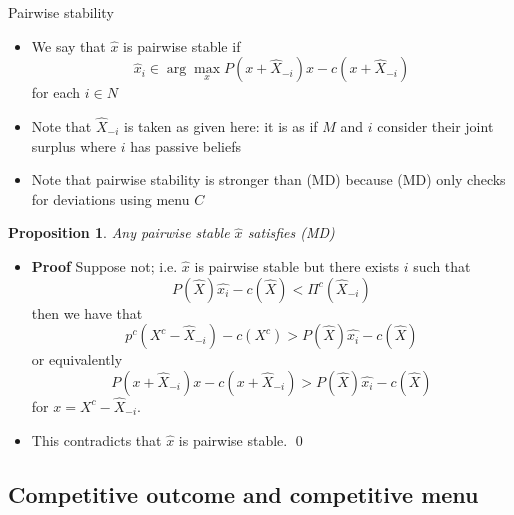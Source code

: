 \documentclass[11pt,english]{beamer}
\newtheorem{proposition}{Proposition}
\begin{document}
\begin{frame}[allowframebreaks]{Pairwise stability}
  \begin{itemize}
  \item We say that $\hat{x}$ is pairwise stable if
    \begin{equation}
      \label{eq:PairwiseStable}
      \hat{x}_i \in \arg\max_{x} P(x+\hat{X}_{-i})x-c(x+\hat{X}_{-i})
    \end{equation}
    for each $i \in N$
  \item Note that $\hat{X}_{-i}$ is taken as given here: it is as if
    $M$ and $i$ consider their joint surplus where $i$ has passive
    beliefs
  \item Note that pairwise stability is stronger than (MD) because
    (MD) only checks for deviations using menu $C$
  \end{itemize}
  \begin{proposition}
    Any pairwise stable $\hat{x}$ satisfies (MD)
  \end{proposition}
  \begin{itemize}
  \item \textbf{Proof} Suppose not; i.e. $\hat{x}$ is pairwise stable
    but there exists $i$ such that
    \begin{equation*}
      P(\hat{X})\hat{x_i} - c(\hat{X}) < \Pi^c(\hat{X}_{-i})
    \end{equation*}
    then we have that
    \begin{equation*}
      p^c(X^c - \hat{X}_{-i}) - c(X^c) >  P(\hat{X})\hat{x_i} - c(\hat{X})
    \end{equation*}
    or equivalently
    \begin{equation*}
      P(x+ \hat{X}_{-i})x - c(x+ \hat{X}_{-i}) >  P(\hat{X})\hat{x_i} - c(\hat{X})
    \end{equation*}
    for $x=X^c- \hat{X}_{-i}$.
  \item This contradicts that $\hat{x}$ is pairwise stable. \qed
  \end{itemize}
\end{frame}

\subsection{Competitive outcome and competitive menu}
\end{document}
